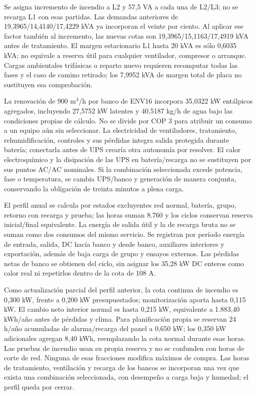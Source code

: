 Se asigna incremento de incendio a L2 y 57,5 VA a cada una de L2/L3; no se recarga L1 con esas partidas. Las demandas anteriores de 19,3965/14,4140/17,4229 kVA ya incorporan el veinte por ciento. Al aplicar ese factor también al incremento, las nuevas cotas son 19,3965/15,1163/17,4919 kVA antes de tratamiento. El margen estacionario L1 hasta 20 kVA es sólo 0,6035 kVA; no equivale a reserva útil para cualquier ventilador, compresor o arranque. Cargas ambientales trifásicas o reparto nuevo requieren recomputar todas las fases y el caso de camino retirado; los 7,9952 kVA de margen total de placa no sustituyen esa comprobación.

La renovación de 900 m$^3$/h por banco de ENV16 incorpora 35,0322 kW entálpicos agregados, incluyendo 27,5752 kW latentes y 40,5187 kg/h de agua bajo las condiciones propias de cálculo. No se divide por COP 3 para atribuir un consumo a un equipo aún sin seleccionar. La electricidad de ventiladores, tratamiento, rehumidificación, controles y sus pérdidas integra salida protegida durante batería; conectarla antes de UPS crearía otra autonomía por resolver. El calor electroquímico y la disipación de las UPS en batería/recarga no se sustituyen por sus puntos AC/AC nominales. Si la combinación seleccionada excede potencia, fase o temperatura, se cambia UPS/banco y generación de manera conjunta, conservando la obligación de treinta minutos a plena carga.

El perfil anual se calcula por estados excluyentes red normal, batería, grupo, retorno con recarga y prueba; las horas suman 8.760 y los ciclos conservan reserva inicial/final equivalente. La energía de salida útil y la de recarga bruta no se suman como dos consumos del mismo servicio. Se registran por período energía de entrada, salida, DC hacia banco y desde banco, auxiliares interiores y exportación, además de baja carga de grupo y ensayos externos. Las pérdidas netas de banco se obtienen del ciclo, sin asignar los 35,28 kW DC enteros como calor real ni repetirlos dentro de la cota de 108 A.

Como actualización parcial del perfil anterior, la cota continua de incendio es 0,300 kW, frente a 0,200 kW presupuestados; monitorización aporta hasta 0,115 kW. El cambio neto interior normal es hasta 0,215 kW, equivalente a 1.883,40 kWh/año antes de pérdidas y clima. Para planificación propia se reservan 24 h/año acumuladas de alarma/recarga del panel a 0,650 kW; los 0,350 kW adicionales agregan 8,40 kWh, reemplazando la cota normal durante esas horas. Las pruebas de incendio usan su propia reserva y no se confunden con horas de corte de red. Ninguna de esas fracciones modifica máximos de compra. Las horas de tratamiento, ventilación y recarga de los bancos se incorporan una vez que exista una combinación seleccionada, con desempeño a carga baja y humedad; el perfil queda por cerrar.


